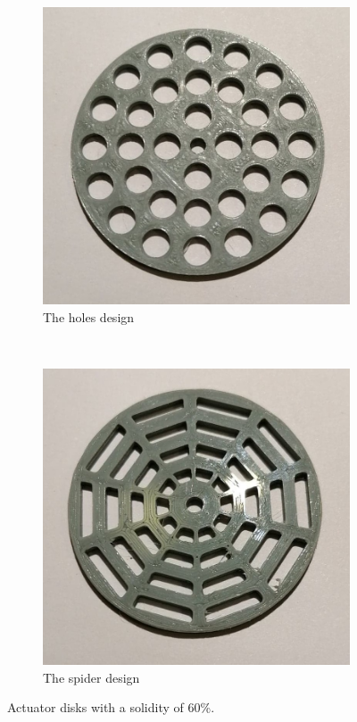 \begin{figure} [h!]
    \centering
    \begin{subfigure}[b]{0.45\linewidth}
        \includegraphics[width=\textwidth]{0_Images/holes60.jpg}
        \caption{The \gls{holes} design}
        \label{Fig:holes60}
    \end{subfigure}
    ~
    \begin{subfigure}[b]{0.45\linewidth}
        \includegraphics[width=\textwidth]{0_Images/spider60.jpg}
        \caption{The \gls{spider} design}
        \label{Fig:spider60}
    \end{subfigure}
    \caption{Actuator disks with a solidity of 60\%.}
    \label{Fig:60Sol}
\end{figure}

